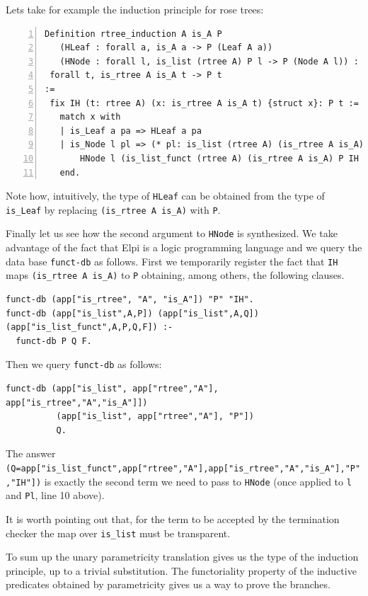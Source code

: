 \documentclass[a4paper,UKenglish,cleveref, autoref]{lipics-v2019}
\begin{document}
Lets take for example the induction principle for rose trees:
\begin{lstlisting}[numbers=left]
Definition rtree_induction A is_A P  
   (HLeaf : forall a, is_A a -> P (Leaf A a))
   (HNode : forall l, is_list (rtree A) P l -> P (Node A l)) :
 forall t, is_rtree A is_A t -> P t
:=
 fix IH (t: rtree A) (x: is_rtree A is_A t) {struct x}: P t :=
   match x with
   | is_Leaf a pa => HLeaf a pa
   | is_Node l pl => (* pl: is_list (rtree A) (is_rtree A is_A) l *)
       HNode l (is_list_funct (rtree A) (is_rtree A is_A) P IH l pl)
   end.
\end{lstlisting}

Note how, intuitively, the type of \lstinline+HLeaf+ can be obtained from the
type of \lstinline+is_Leaf+ by replacing \lstinline+(is_rtree A is_A)+
with \lstinline+P+.

Finally let us see  how the second argument to \lstinline+HNode+ is
synthesized.  We take advantage of the fact that Elpi is a logic
programming language and we query the data base \lstinline+funct-db+
as follows. First we temporarily register 
the fact that \lstinline+IH+ maps
\lstinline+(is_rtree A is_A)+ to \lstinline+P+ obtaining, among others,
the following clauses.
\begin{lstlisting}[]
funct-db (app["is_rtree", "A", "is_A"]) "P" "IH".
funct-db (app["is_list",A,P]) (app["is_list",A,Q]) (app["is_list_funct",A,P,Q,F]) :-
  funct-db P Q F.
\end{lstlisting}

Then we query \lstinline+funct-db+ as follows:
\begin{lstlisting}[]
funct-db (app["is_list", app["rtree","A"], app["is_rtree","A","is_A"]])
          (app["is_list", app["rtree","A"], "P"])
          Q.
\end{lstlisting}

\noindent
The answer \lstinline+(Q=app["is_list_funct",app["rtree","A"],app["is_rtree","A","is_A"],"P","IH"])+
is exactly the second term we need to pass to \lstinline+HNode+
(once applied to \lstinline+l+ and \lstinline+Pl+, line 10 above).

It is worth pointing out that, for the term to be accepted
by the termination checker the map over \lstinline+is_list+
must be transparent.

To sum up the unary parametricity translation gives us the type
of the induction principle, up to a trivial substitution.
The functoriality property of the inductive predicates obtained by
parametricity gives us a way to prove the branches.
\end{document}
